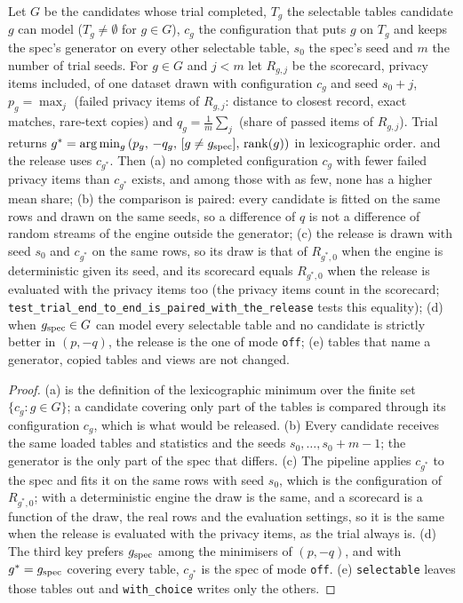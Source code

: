 \setcounter{proposition}{1844}
\begin{proposition}\label{prop:trialselect}
Let $G$ be the candidates whose trial completed, $T_g$ the selectable tables candidate $g$ can model ($T_g\neq\emptyset$ for $g\in G$), $c_g$ the configuration that puts $g$ on $T_g$ and keeps the spec's generator on every other selectable table, $s_0$ the spec's seed and $m$ the number of trial seeds. For $g\in G$ and $j<m$ let $R_{g,j}$ be the scorecard, privacy items included, of one dataset drawn with configuration $c_g$ and seed $s_0+j$, $p_g=\max_j$ (failed privacy items of $R_{g,j}$: distance to closest record, exact matches, rare-text copies) and $q_g=\frac1m\sum_j$ (share of passed items of $R_{g,j}$). Trial returns $g^\ast=\arg\min_g\,(p_g,\,-q_g,\,[g\neq g_{\rm spec}],\,\mathrm{rank}(g))$ in lexicographic order. and the release uses $c_{g^\ast}$. Then (a) no completed configuration $c_g$ with fewer failed privacy items than $c_{g^\ast}$ exists, and among those with as few, none has a higher mean share; (b) the comparison is paired: every candidate is fitted on the same rows and drawn on the same seeds, so a difference of $q$ is not a difference of random streams of the engine outside the generator; (c) the release is drawn with seed $s_0$ and $c_{g^\ast}$ on the same rows, so its draw is that of $R_{g^\ast,0}$ when the engine is deterministic given its seed, and its scorecard equals $R_{g^\ast,0}$ when the release is evaluated with the privacy items too (the privacy items count in the scorecard; \texttt{test\_trial\_end\_to\_end\_is\_paired\_with\_the\_release} tests this equality); (d) when $g_{\rm spec}\in G$ can model every selectable table and no candidate is strictly better in $(p,-q)$, the release is the one of mode \texttt{off}; (e) tables that name a generator, copied tables and views are not changed.
\end{proposition}
\begin{proof}
(a) is the definition of the lexicographic minimum over the finite set $\{c_g: g\in G\}$; a candidate covering only part of the tables is compared through its configuration $c_g$, which is what would be released. (b) Every candidate receives the same loaded tables and statistics and the seeds $s_0,\dots,s_0+m-1$; the generator is the only part of the spec that differs. (c) The pipeline applies $c_{g^\ast}$ to the spec and fits it on the same rows with seed $s_0$, which is the configuration of $R_{g^\ast,0}$; with a deterministic engine the draw is the same, and a scorecard is a function of the draw, the real rows and the evaluation settings, so it is the same when the release is evaluated with the privacy items, as the trial always is. (d) The third key prefers $g_{\rm spec}$ among the minimisers of $(p,-q)$, and with $g^\ast=g_{\rm spec}$ covering every table, $c_{g^\ast}$ is the spec of mode \texttt{off}. (e) \texttt{selectable} leaves those tables out and \texttt{with\_choice} writes only the others.
\end{proof}
